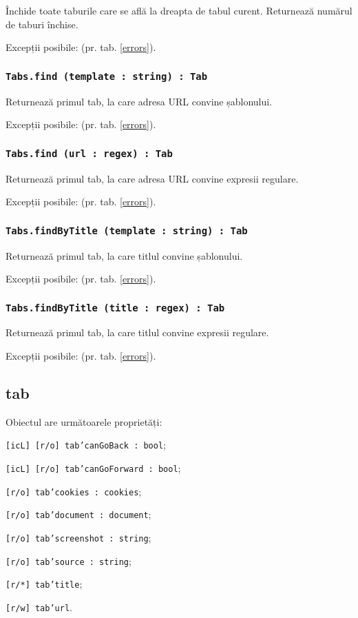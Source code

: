 Închide toate taburile care se află la dreapta de tabul curent. Returnează numărul de taburi închise.

Excepții posibile:  (pr. tab. \ref{errors}).

\subsubsection{\texttt{Tabs.find (template : string) : Tab}}

Returnează primul tab, la care adresa URL convine șablonului.

Excepții posibile:  (pr. tab. \ref{errors}).

\subsubsection{\texttt{Tabs.find (url : regex) : Tab}}

Returnează primul tab, la care adresa URL convine expresii regulare.

Excepții posibile:  (pr. tab. \ref{errors}).

\subsubsection{\texttt{Tabs.findByTitle (template : string) : Tab}}

Returnează primul tab, la care titlul convine șablonului.

Excepții posibile:  (pr. tab. \ref{errors}).

\subsubsection{\texttt{Tabs.findByTitle (title : regex) : Tab}}

Returnează primul tab, la care titlul convine expresii regulare.

Excepții posibile:  (pr. tab. \ref{errors}).

\subsection{{\color{orange} tab}}

Obiectul \tab{} are următoarele proprietăți:
\begin{icItems}
	\item \texttt{[icL] [r/o] tab'canGoBack : bool};
	\item \texttt{[icL] [r/o] tab'canGoForward : bool};
	\item \texttt{[r/o] tab'cookies : cookies};
	\item \texttt{[r/o] tab'document : document};
	\item \texttt{[r/o] tab'screenshot : string};
	\item \texttt{[r/o] tab'source : string};
	\item \texttt{[r/*] tab'title};
	\item \texttt{[r/w] tab'url}.
\end{icItems}

